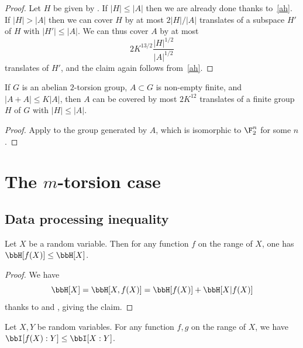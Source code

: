 \begin{proof}
  \leanok
  Let $H$ be given by .
  If $|H| \leq |A|$ then we are already done thanks to~\eqref{ah}.  If $|H| > |A|$ then we can cover $H$ by at most $2 |H|/|A|$ translates of a subspace $H'$ of $H$ with $|H'| \leq |A|$.  We can thus cover $A$ by at most
  \[2K^{13/2} \frac{|H|^{1/2}}{|A|^{1/2}}\]
  translates of $H'$, and the claim again follows from~\eqref{ah}.
\end{proof}

\begin{corollary}\label{pfr-cor}
  \leanok
  If $G$ is an abelian $2$-torsion group, $A \subset G$ is non-empty finite, and $|A+A| \leq K|A|
  $, then $A$ can be covered by most $2K^{12}$ translates of a finite group  $H$ of $G$ with $|H| \leq |A|$.
  \end{corollary}

\begin{proof}\leanok  Apply  to the group generated by $A$, which is isomorphic to $\F_2^n$ for some $n$.
\end{proof}


\chapter{The \texorpdfstring{$m$}{m}-torsion case}

\section{Data processing inequality}

\begin{lemma}\label{data-process-single}\leanok  Let $X$ be a random variable.  Then for any function $f$ on the range of $X$, one has $\bbH[f(X)] \leq \bbH[X]$.
\end{lemma}

\begin{proof}\leanok
We have
$$ \bbH[X] = \bbH[X,f(X)] = \bbH[f(X)] + \bbH[X|f(X)]$$
thanks to  and , giving the claim.
\end{proof}

\begin{lemma}\label{data-process-unc-one}\leanok Let $X,Y$ be random variables. For any function $f, g$ on the range of $X$, we have $\bbI[f(X) : Y] \leq \bbI[X:Y]$.
\end{lemma}

